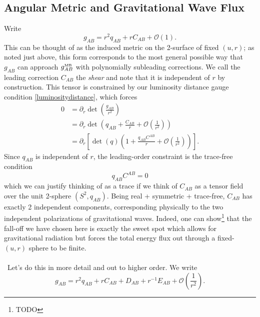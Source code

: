 \documentclass[11pt,letterpaper]{article}
\newcommand{\LP}{\left(}
\newcommand{\RP}{\right)}
\newcommand{\mc}[1]{\mathcal{#1}}
\newcommand{\D}{\partial}
\begin{document}
\subsection{Angular Metric and Gravitational Wave Flux}
Write \begin{equation}
g_{AB} = r^2 q_{AB} + r C_{AB} + \mc{O}(1).
\end{equation}
This can be thought of as the induced metric on the 2-surface of fixed $(u,r)$; as noted just above, this form corresponds to the most general possible way that $g_{AB}$ can approach $g_{AB}^{\mbox{\tiny{MB}}}$ with polynomially subleading corrections. We call the leading correction $C_{AB}$ the \textit{shear} and note that it is independent of $r$ by construction. This tensor is constrained by our luminosity distance gauge condition \eqref{luminositydistance}, which forces \begin{equation}
\begin{aligned}
0 & = \D_r \det \LP \frac{g_{AB}}{r^2} \RP \\
& = \D_r \det \LP q_{AB} + \frac{C_{AB}}{r} + \mc{O}\LP \frac{1}{r^2} \RP \RP \\
& = \D_r \left[ \det(q) \LP 1 + \frac{q_{AB} C^{AB}}{r} + \mc{O} \LP \frac{1}{r^2} \RP \RP \right].
\end{aligned}
\end{equation}
Since $q_{AB}$ is independent of $r$, the leading-order constraint is the trace-free condition \begin{equation}
q_{AB} C^{AB} = 0
\end{equation}
which we can justify thinking of as a trace if we think of $C_{AB}$ as a tensor field over the unit 2-sphere $(S^2, q_{AB})$. Being real + symmetric + trace-free, $C_{AB}$ has exactly 2 independent components, corresponding physically to the two independent polarizations of gravitational waves. Indeed, one can show\footnote{TODO} that the fall-off we have chosen here is exactly the sweet spot which allows for gravitational radiation but forces the total energy flux out through a fixed-$(u,r)$ sphere to be finite. \\
\\
\
Let's do this in more detail and out to higher order.  We write \begin{equation}
g_{AB} = r^2 q_{AB} + r C_{AB} + D_{AB} + r^{-1} E_{AB} + \mc{O} \LP \frac{1}{r^2} \RP.
\end{equation}
\end{document}
